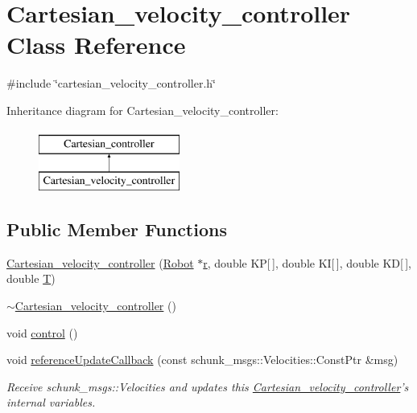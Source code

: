 \hypertarget{classCartesian__velocity__controller}{\section{Cartesian\-\_\-velocity\-\_\-controller Class Reference}
\label{classCartesian__velocity__controller}
}


{\ttfamily \#include \char`\"{}cartesian\-\_\-velocity\-\_\-controller.\-h\char`\"{}}

Inheritance diagram for Cartesian\-\_\-velocity\-\_\-controller\-:\begin{figure}[H]
\begin{center}
\leavevmode
\includegraphics[height=2.000000cm]{classCartesian__velocity__controller}
\end{center}
\end{figure}
\subsection*{Public Member Functions}
\begin{DoxyCompactItemize}
\item 
\hyperlink{classCartesian__velocity__controller_adc909b782b16fa12148302cc501300c6}{Cartesian\-\_\-velocity\-\_\-controller} (\hyperlink{structRobot}{Robot} $\ast$\hyperlink{classCartesian__controller_a5562129951bd802e4ded77fc716c87a0}{r}, double K\-P\mbox{[}$\,$\mbox{]}, double K\-I\mbox{[}$\,$\mbox{]}, double K\-D\mbox{[}$\,$\mbox{]}, double \hyperlink{classCartesian__controller_a35c6ddbb9624878f2807ff644a33e832}{T})
\item 
\hyperlink{classCartesian__velocity__controller_a6fd50fdb7e9e05ef99769e840cbb15c6}{$\sim$\-Cartesian\-\_\-velocity\-\_\-controller} ()
\item 
void \hyperlink{classCartesian__velocity__controller_a249bd167cd995e16906731172d1bc516}{control} ()
\item 
void \hyperlink{classCartesian__velocity__controller_a2f020f22b2e63da5afeff3f083e4095c}{reference\-Update\-Callback} (const schunk\-\_\-msgs\-::\-Velocities\-::\-Const\-Ptr \&msg)
\begin{DoxyCompactList}\small\item\em Receive schunk\-\_\-msgs\-::\-Velocities and updates this \hyperlink{classCartesian__velocity__controller}{Cartesian\-\_\-velocity\-\_\-controller}'s internal variables. \end{DoxyCompactList}\end{DoxyCompactItemize}
